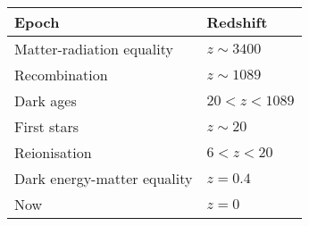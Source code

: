 \begin{tabular}{ll}
 \toprule
  Epoch & Redshift \\
 \midrule
 \midrule
 Matter-radiation equality &
 \(z\sim3400\)
 \\
 Recombination &
 \(z\sim1089\)
 \\
 Dark ages &
 \(20<z<1089\)
 \\
 First stars &
 \(z\sim20\)
 \\
 Reionisation &
 \(6<z<20\)
 \\
 Dark energy-matter equality &
 \(z=0.4\)
 \\
 Now &
 \(z=0\)
 \\
 \bottomrule
\end{tabular}
